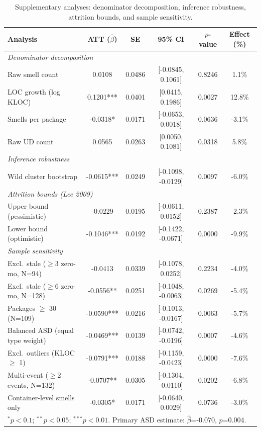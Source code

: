 \begin{table}[t]
\centering
\caption{Supplementary analyses: denominator decomposition, inference robustness, attrition bounds, and sample sensitivity.}
\label{tab:supplementary}
\begin{tabular}{lccccc}
\toprule
Analysis & ATT ($\hat{\beta}$) & SE & 95\% CI & $p$-value & Effect (\%) \\
\midrule
\multicolumn{6}{l}{\textit{Denominator decomposition}} \\
Raw smell count & 0.0108 & 0.0486 & [-0.0845, 0.1061] & 0.8246 & 1.1\% \\
LOC growth (log KLOC) & 0.1201*** & 0.0401 & [0.0415, 0.1986] & 0.0027 & 12.8\% \\
Smells per package & -0.0318* & 0.0171 & [-0.0653, 0.0018] & 0.0636 & -3.1\% \\
Raw UD count & 0.0565 & 0.0263 & [0.0050, 0.1081] & 0.0318 & 5.8\% \\
\midrule
\multicolumn{6}{l}{\textit{Inference robustness}} \\
Wild cluster bootstrap & -0.0615*** & 0.0249 & [-0.1098, -0.0129] & 0.0097 & -6.0\% \\
\midrule
\multicolumn{6}{l}{\textit{Attrition bounds (Lee 2009)}} \\
Upper bound (pessimistic) & -0.0229 & 0.0195 & [-0.0611, 0.0152] & 0.2387 & -2.3\% \\
Lower bound (optimistic) & -0.1046*** & 0.0192 & [-0.1422, -0.0671] & 0.0000 & -9.9\% \\
\midrule
\multicolumn{6}{l}{\textit{Sample sensitivity}} \\
Excl.\ stale ($\geq$3 zero-mo, N=94) & -0.0413 & 0.0339 & [-0.1078, 0.0252] & 0.2234 & -4.0\% \\
Excl.\ stale ($\geq$6 zero-mo, N=128) & -0.0556** & 0.0251 & [-0.1048, -0.0063] & 0.0269 & -5.4\% \\
Packages $\geq$ 30 (N=109) & -0.0590*** & 0.0216 & [-0.1013, -0.0167] & 0.0063 & -5.7\% \\
Balanced ASD (equal type weight) & -0.0469*** & 0.0139 & [-0.0742, -0.0196] & 0.0007 & -4.6\% \\
Excl.\ outliers (KLOC $\geq$ 1) & -0.0791*** & 0.0188 & [-0.1159, -0.0423] & 0.0000 & -7.6\% \\
Multi-event ($\geq$2 events, N=132) & -0.0707** & 0.0305 & [-0.1304, -0.0110] & 0.0202 & -6.8\% \\
Container-level smells only & -0.0305* & 0.0171 & [-0.0640, 0.0029] & 0.0736 & -3.0\% \\
\bottomrule
\multicolumn{6}{l}{\footnotesize $^{*}p<0.1$; $^{**}p<0.05$; $^{***}p<0.01$. Primary ASD estimate: $\hat{\beta}$=-0.070, $p$=0.004.} \\
\end{tabular}
\end{table}
